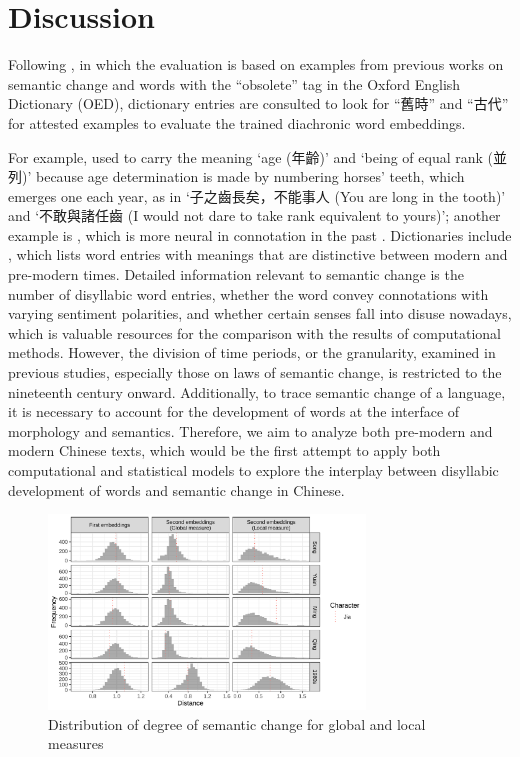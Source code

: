 

\section{Discussion}
Following \textcite{hamilton2016law}, in which the evaluation is based on examples from previous works on semantic change and words with the ``obsolete'' tag in the Oxford English Dictionary (OED), dictionary entries are consulted to look for ``舊時'' and ``古代'' for attested examples to evaluate the trained diachronic word embeddings.

For example,  used to carry the meaning `age (年齡)' and `being of equal rank (並列)' because age determination is made by numbering horses' teeth, which emerges one each year, as in `子之齒長矣，不能事人 (You are long in the tooth)' and `不敢與諸任齒 (I would not dare to take rank equivalent to yours)'; another example is , which is more neural in connotation in the past \parencite[前言]{wang1997gujinyiyi}. Dictionaries include \textcite{wang1997gujinyiyi,liu1992gujinyi}, which lists word entries with meanings that are distinctive between modern and pre-modern times. Detailed information relevant to semantic change is the number of disyllabic word entries, whether the word convey connotations with varying sentiment polarities, and whether certain senses fall into disuse nowadays, which is valuable resources for the comparison with the results of computational methods. However, the division of time periods, or the granularity, examined in previous studies, especially those on laws of semantic change, is restricted to the nineteenth century onward. Additionally, to trace semantic change of a language, it is necessary to account for the development of words at the interface of morphology and semantics. Therefore, we aim to analyze both pre-modern and modern Chinese texts, which would be the first attempt to apply both computational and statistical models to explore the interplay between disyllabic development of words and semantic change in Chinese.

\begin{figure}[H]
  \centering
  \includegraphics[width=0.75\textwidth,keepaspectratio]{figures_new/measures/dist_hist_w5.pdf}
  \caption{Distribution of degree of semantic change for global and local measures}
\end{figure}

